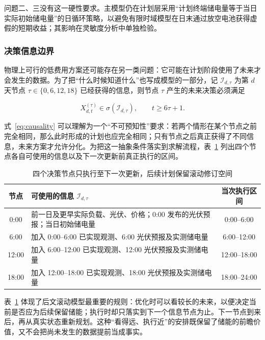 问题二、三没有这一硬性要求。主模型仍在计划层采用“计划终端储电量等于当日实际初始储电量”的日循环策略，以避免有限时域模型在日末通过放空电池获得虚假的短期收益；其影响在灵敏度分析中单独检验。

\subsubsection{决策信息边界}

物理上可行的低费用方案还可能存在另一类问题：它可能在计划阶段使用了未来才会发生的数据。为了把“什么时候知道什么”也写成模型的一部分，记 $\mathcal I_{d,\tau}$ 为第 $d$ 天节点 $\tau\in\{0,6,12,18\}$ 已经获得的信息，则节点 $\tau$ 产生的未来决策必须满足

\begin{equation}
    X_{d,t}^{(\tau)}\in\sigma(\mathcal I_{d,\tau}),
    \qquad t\ge6\tau+1 .
    \label{eq:causality}
\end{equation}

式~\eqref{eq:causality} 可以理解为一个“不可预知性”要求：若两个情形在某个节点之前完全相同，那么此时形成的计划也应完全相同；只有节点之后真正获得了不同信息，未来方案才允许分化。为把这一抽象条件落实到求解流程，表~\ref{tab:information-set} 列出四个节点各自可使用的信息以及下一次更新前真正执行的区间。

\begin{table}[htbp]
    \caption{四个决策节点只执行至下一次更新，后续计划保留滚动修订空间}
    \label{tab:information-set}
    \centering
    \begin{tabularx}{0.96\textwidth}{c X c}
        \toprule
        节点 & 可使用的信息 $\mathcal I_{d,\tau}$ & 当次执行区间 \\
        \midrule
        0:00 & 前一日及更早实际负载、光伏、价格；0:00 发布的光伏预报；当日初始储电量 & 0:00--6:00 \\
        6:00 & 加入 0:00--6:00 已实现观测、6:00 光伏预报及实测储电量 & 6:00--12:00 \\
        12:00 & 加入 6:00--12:00 已实现观测、12:00 光伏预报及实测储电量 & 12:00--18:00 \\
        18:00 & 加入 12:00--18:00 已实现观测、18:00 光伏预报及实测储电量 & 18:00--24:00 \\
        \bottomrule
    \end{tabularx}
\end{table}

表~\ref{tab:information-set} 体现了后文滚动模型最重要的规则：优化时可以看较长的未来，以便决定当前是否应为后续保留储能；执行时却只落实到下一个信息节点为止。下一节点到来后，再从真实状态重新规划。这种“看得远、执行近”的安排既保留了储能的前瞻价值，又不会把尚未发生的数据提前当成事实。

